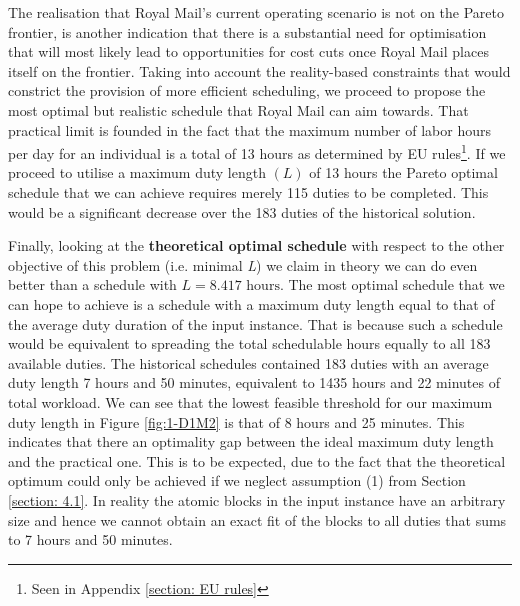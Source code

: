 \vspace{\baselineskip}
\noindent
The realisation that Royal Mail's current operating scenario is not on the Pareto frontier, is another indication that there is a substantial need for optimisation that will most likely lead to opportunities for cost cuts once Royal Mail places itself on the frontier. Taking into account the reality-based constraints that would constrict the provision of more efficient scheduling, we proceed to propose the most optimal but realistic schedule that Royal Mail can aim towards. That practical limit is founded in the fact that the maximum number of labor hours per day for an individual is a total of 13 hours as determined by EU rules\footnote{Seen in Appendix \ref{section: EU rules}}. If we proceed to utilise a maximum duty length $(L)$ of 13 hours the Pareto optimal schedule that we can achieve requires merely 115 duties to be completed. This would be a significant decrease over the 183 duties of the historical solution.

\vspace{\baselineskip}
\noindent
Finally, looking at the \textbf{theoretical optimal schedule} with respect to the other objective of this problem (i.e. minimal \textit{L}) we claim in theory we can do even better than a schedule with $L=8.417 \text{ hours}$. The most optimal schedule that we can hope to achieve is a schedule with a maximum duty length equal to that of the average duty duration of the input instance. That is because such a schedule would be equivalent to spreading the total schedulable hours equally to all 183 available duties. The historical schedules contained 183 duties with an average duty length 7 hours and 50 minutes, equivalent to 1435 hours and 22 minutes of total workload. We can see that the lowest feasible threshold for our maximum duty length in Figure \ref{fig:1-D1M2} is that of 8 hours and 25 minutes. This indicates that there an optimality gap between the ideal maximum duty length and the practical one. This is to be expected, due to the fact that the theoretical optimum could only be achieved if we neglect assumption (1) from Section \ref{section: 4.1}. In reality the atomic blocks in the input instance have an arbitrary size and hence we cannot obtain an exact fit of the blocks to all duties that sums to 7 hours and 50 minutes.


